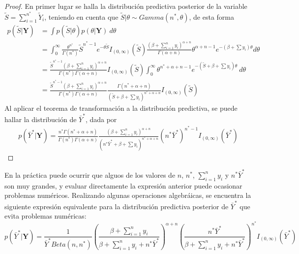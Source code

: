 \documentclass[10pt,openright]{book}\usepackage[]{graphicx}\usepackage[]{color}
\begin{document}
    \begin{proof}
    En primer lugar se halla la distribuci\'on predictiva posterior de la variable $\tilde{S}=\sum_{i=1}^{n^*}\tilde{Y}_i$, teniendo en cuenta que $\tilde{S}|\theta\sim Gamma(n^*,\theta)$, de esta forma
    \begin{align*}
    p(\tilde{S}|\mathbf{Y})&=\int p(\tilde{S}|\theta)p(\theta|\mathbf{Y})\ d\theta\\
    &=\int_0^{\infty} \frac{\theta^{n^*}}{\Gamma(n^*)}\tilde{S}^{n^*-1}e^{-\theta\tilde{S}}I_{(0,\infty)}(\tilde{S})\frac{(\beta+\sum_{i=1}^ny_i)^{\alpha+n}}{\Gamma(\alpha+n)}\theta^{{\alpha+n-1}}e^{-(\beta+\sum y_i)\theta}d\theta\\
    &=\frac{\tilde{S}^{n^*-1}(\beta+\sum_{i=1}^ny_i)^{\alpha+n}}{\Gamma(n^*)\Gamma(\alpha+n)}I_{(0,\infty)}(\tilde{S})\int_0^{\infty} \theta^{n^*+\alpha+n-1}e^{-(\tilde{S}+\beta+\sum y_i)\theta}\ d\theta\\
    &=\frac{\tilde{S}^{n^*-1}(\beta+\sum_{i=1}^ny_i)^{\alpha+n}}{\Gamma(n^*)\Gamma(\alpha+n)}\frac{\Gamma(n^*+\alpha+n)}{(\tilde{S}+\beta+\sum y_i)^{n^*+\alpha+n}}I_{(0,\infty)}(\tilde{S})
    \end{align*}
    Al aplicar el teorema de transformaci\'on a la distribuci\'on predictiva, se puede hallar la distribuci\'on de $\bar{Y}^*$, dada por
    \begin{align*}
    p(\bar{Y}^*|\mathbf{Y})=\frac{n^*\Gamma(n^*+\alpha+n)}{\Gamma(n^*)\Gamma(\alpha+n)}\frac{(\beta+\sum_{i=1}^ny_i)^{\alpha+n}}{(n^*\bar{Y}^*+\beta+\sum y_i)^{n^*+\alpha+n}}(n^*\bar{Y}^*)^{n^*-1}I_{(0,\infty)}(\bar{Y}^*)
    \end{align*}
    \end{proof}
    
    En la pr\'actica puede ocurrir que alguos de los valores de $n$, $n^*$, $\sum_{i=1}^ny_i$ y $n^*\bar{Y}^*$ son muy grandes, y evaluar directamente la expresi\'on anterior puede ocasionar problemas num\'ericos. Realizando algunas operaciones algebr\'aicas, se encuentra la siguiente expresi\'on equivalente para la distribuci\'on predictiva posterior de $\bar{Y}^*$ que evita problemas num\'ericas:
    \begin{equation}\label{pred_expo_Informa2}
    p(\bar{Y}^*|\mathbf{Y})=\frac{1}{\bar{Y}^*Beta(n,n^*)}\left(\frac{\beta+\sum_{i=1}^ny_i}{\beta+\sum_{i=1}^ny_i+n^*\bar{Y}^*}\right)^{\alpha+n}\left(\frac{n^*\bar{Y}^*}{\beta+\sum_{i=1}^ny_i+n^*\bar{Y}^*}\right)^{n^*}I_{(0,\infty)}(\bar{Y}^*)
    \end{equation}
    
\end{document}
